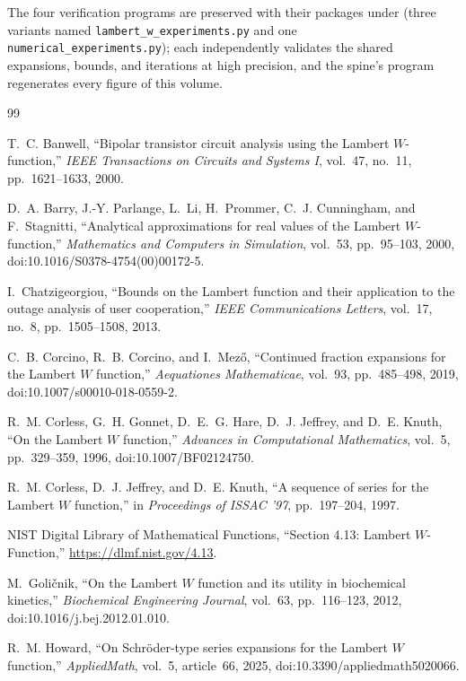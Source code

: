 \documentclass[11pt]{article}
\theoremstyle{remark}
\begin{document}
The four verification programs are preserved with their packages under
 (three variants named
\texttt{lambert\_w\_experiments.py} and one
\texttt{numerical\_experiments.py}); each independently validates the shared
expansions, bounds, and iterations at high precision, and the spine's
program regenerates every figure of this volume.

\begin{thebibliography}{99}

T.~C. Banwell,
``Bipolar transistor circuit analysis using the Lambert \(W\)-function,''
\emph{IEEE Transactions on Circuits and Systems I}, vol.~47, no.~11,
pp.~1621--1633, 2000.

D.~A. Barry, J.-Y. Parlange, L.~Li, H.~Prommer, C.~J. Cunningham, and
F.~Stagnitti,
``Analytical approximations for real values of the Lambert \(W\)-function,''
\emph{Mathematics and Computers in Simulation}, vol.~53, pp.~95--103,
2000, doi:10.1016/S0378-4754(00)00172-5.

I.~Chatzigeorgiou,
``Bounds on the Lambert function and their application to the outage
analysis of user cooperation,''
\emph{IEEE Communications Letters}, vol.~17, no.~8, pp.~1505--1508, 2013.

C.~B. Corcino, R.~B. Corcino, and I.~Mez\H{o},
``Continued fraction expansions for the Lambert \(W\) function,''
\emph{Aequationes Mathematicae}, vol.~93, pp.~485--498, 2019,
doi:10.1007/s00010-018-0559-2.

R.~M. Corless, G.~H. Gonnet, D.~E.~G. Hare, D.~J. Jeffrey, and D.~E. Knuth,
``On the Lambert \(W\) function,''
\emph{Advances in Computational Mathematics}, vol.~5, pp.~329--359, 1996,
doi:10.1007/BF02124750.

R.~M. Corless, D.~J. Jeffrey, and D.~E. Knuth,
``A sequence of series for the Lambert \(W\) function,'' in
\emph{Proceedings of ISSAC '97}, pp.~197--204, 1997.

NIST Digital Library of Mathematical Functions,
``Section 4.13: Lambert \(W\)-Function,''
\url{https://dlmf.nist.gov/4.13}.

M.~Goli\v{c}nik,
``On the Lambert \(W\) function and its utility in biochemical kinetics,''
\emph{Biochemical Engineering Journal}, vol.~63, pp.~116--123, 2012,
doi:10.1016/j.bej.2012.01.010.

R.~M. Howard,
``On Schr\"oder-type series expansions for the Lambert \(W\) function,''
\emph{AppliedMath}, vol.~5, article~66, 2025,
doi:10.3390/appliedmath5020066.


\end{thebibliography}
\end{document}
